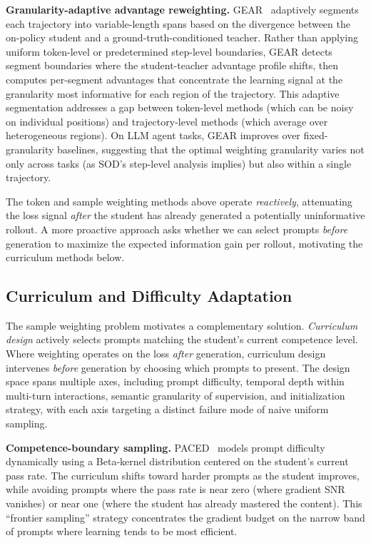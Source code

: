 \documentclass{article} %
\begin{document}
\textbf{Granularity-adaptive advantage reweighting.} GEAR~\citep{2605.11853} adaptively segments each trajectory into variable-length spans based on the divergence between the on-policy student and a ground-truth-conditioned teacher. Rather than applying uniform token-level or predetermined step-level boundaries, GEAR detects segment boundaries where the student-teacher advantage profile shifts, then computes per-segment advantages that concentrate the learning signal at the granularity most informative for each region of the trajectory. This adaptive segmentation addresses a gap between token-level methods (which can be noisy on individual positions) and trajectory-level methods (which average over heterogeneous regions). On LLM agent tasks, GEAR improves over fixed-granularity baselines, suggesting that the optimal weighting granularity varies not only across tasks (as SOD's step-level analysis implies) but also within a single trajectory.

The token and sample weighting methods above operate \emph{reactively}, attenuating the loss signal \emph{after} the student has already generated a potentially uninformative rollout. A more proactive approach asks whether we can select prompts \emph{before} generation to maximize the expected information gain per rollout, motivating the curriculum methods below.

\subsection{Curriculum and Difficulty Adaptation}
\label{subsec:curriculum}

The sample weighting problem motivates a complementary solution. \emph{Curriculum design} actively selects prompts matching the student's current competence level. Where weighting operates on the loss \emph{after} generation, curriculum design intervenes \emph{before} generation by choosing which prompts to present. The design space spans multiple axes, including prompt difficulty, temporal depth within multi-turn interactions, semantic granularity of supervision, and initialization strategy, with each axis targeting a distinct failure mode of naive uniform sampling.

\textbf{Competence-boundary sampling.} PACED~\citep{2603.11178} models prompt difficulty dynamically using a Beta-kernel distribution centered on the student's current pass rate. The curriculum shifts toward harder prompts as the student improves, while avoiding prompts where the pass rate is near zero (where gradient SNR vanishes) or near one (where the student has already mastered the content). This ``frontier sampling'' strategy concentrates the gradient budget on the narrow band of prompts where learning tends to be most efficient.
\end{document}
